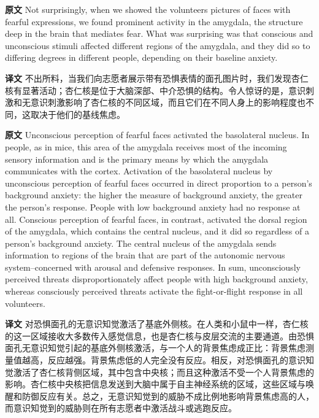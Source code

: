 \documentclass[UTF8]{ctexart}
\newenvironment{english}{\par\small\noindent\textbf{原文}\quad\ignorespaces}{\par}
\newenvironment{zhtranslation}{\par\noindent\textbf{译文}\quad\ignorespaces}{\par\vspace{0.35em}}
\begin{document}
\begin{english}
Not surprisingly, when we showed the volunteers pictures of faces with fearful expressions, we found prominent activity in the amygdala, the structure deep in the brain that mediates fear. What was surprising was that conscious and unconscious stimuli affected different regions of the amygdala, and they did so to differing degrees in different people, depending on their baseline anxiety.
\end{english}
\begin{zhtranslation}
不出所料，当我们向志愿者展示带有恐惧表情的面孔图片时，我们发现杏仁核有显著活动；杏仁核是位于大脑深部、中介恐惧的结构。令人惊讶的是，意识刺激和无意识刺激影响了杏仁核的不同区域，而且它们在不同人身上的影响程度也不同，这取决于他们的基线焦虑。\end{zhtranslation}

\begin{english}
Unconscious perception of fearful faces activated the basolateral nucleus. In people, as in mice, this area of the amygdala receives most of the incoming sensory information and is the primary means by which the amygdala communicates with the cortex. Activation of the basolateral nucleus by unconscious perception of fearful faces occurred in direct proportion to a person's background anxiety: the higher the measure of background anxiety, the greater the person's response. People with low background anxiety had no response at all. Conscious perception of fearful faces, in contrast, activated the dorsal region of the amygdala, which contains the central nucleus, and it did so regardless of a person's background anxiety. The central nucleus of the amygdala sends information to regions of the brain that are part of the autonomic nervous system--concerned with arousal and defensive responses. In sum, unconsciously perceived threats disproportionately affect people with high background anxiety, whereas consciously perceived threats activate the fight-or-flight response in all volunteers.
\end{english}
\begin{zhtranslation}
对恐惧面孔的无意识知觉激活了基底外侧核。在人类和小鼠中一样，杏仁核的这一区域接收大多数传入感觉信息，也是杏仁核与皮层交流的主要通道。由恐惧面孔无意识知觉引起的基底外侧核激活，与一个人的背景焦虑成正比：背景焦虑测量值越高，反应越强。背景焦虑低的人完全没有反应。相反，对恐惧面孔的意识知觉激活了杏仁核背侧区域，其中包含中央核；而且这种激活不受一个人背景焦虑的影响。杏仁核中央核把信息发送到大脑中属于自主神经系统的区域，这些区域与唤醒和防御反应有关。总之，无意识知觉到的威胁不成比例地影响背景焦虑高的人，而意识知觉到的威胁则在所有志愿者中激活战斗或逃跑反应。\end{zhtranslation}
\end{document}
